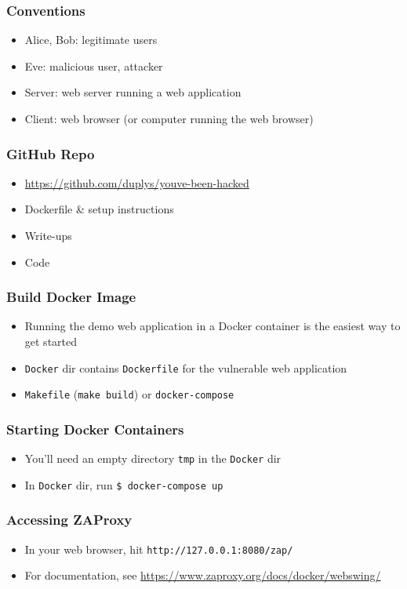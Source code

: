 \begin{frame}
	\frametitle{Conventions}
	\begin{itemize}
		\item Alice, Bob: legitimate users
		\item Eve: malicious user, attacker
		\item Server: web server running a web application
		\item Client: web browser (or computer running the web browser)
	\end{itemize}
\end{frame}

\begin{frame}
	\frametitle{GitHub Repo}
	\begin{itemize}
		\item \url{https://github.com/duplys/youve-been-hacked}
		\item Dockerfile \& setup instructions
		\item Write-ups
		\item Code
	\end{itemize}
\end{frame}

\begin{frame}
	\frametitle{Build Docker Image}
	\begin{itemize}
		\item Running the demo web application in a Docker container is the easiest way to get started
		\item \texttt{Docker} dir contains \texttt{Dockerfile} for the vulnerable web application
		\item \texttt{Makefile} (\texttt{make build}) or \texttt{docker-compose}
	\end{itemize}
	
\end{frame}

\begin{frame}[fragile]
	\frametitle{Starting Docker Containers}
	\begin{itemize}
        \item You'll need an empty directory \texttt{tmp} in the \texttt{Docker} dir
		\item In \texttt{Docker} dir, run \verb|$ docker-compose up|
	\end{itemize}
\end{frame}

\begin{frame}[fragile]
	\frametitle{Accessing ZAProxy}
	\begin{itemize}
		\item In your web browser, hit \verb|http://127.0.0.1:8080/zap/|
        \item For documentation, see \url{https://www.zaproxy.org/docs/docker/webswing/}
	\end{itemize}
\end{frame}

